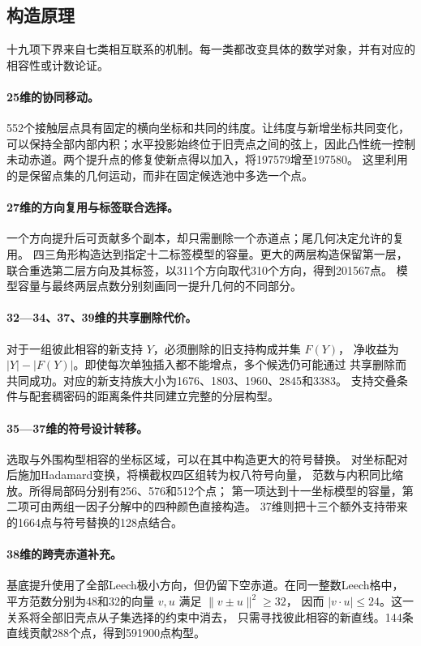 \subsection{构造原理}

十九项下界来自七类相互联系的机制。每一类都改变具体的数学对象，并有对应的
相容性或计数论证。

\paragraph{25维的协同移动。}
552个接触层点具有固定的横向坐标和共同的纬度。让纬度与新增坐标共同变化，
可以保持全部内部内积；水平投影始终位于旧壳点之间的弦上，因此凸性统一控制
未动赤道。两个提升点的修复使新点得以加入，将197579增至197580。
这里利用的是保留点集的几何运动，而非在固定候选池中多选一个点。

\paragraph{27维的方向复用与标签联合选择。}
一个方向提升后可贡献多个副本，却只需删除一个赤道点；尾几何决定允许的复用。
四三角形构造达到指定十二标签模型的容量。更大的两层构造保留第一层，
联合重选第二层方向及其标签，以311个方向取代310个方向，得到201567点。
模型容量与最终两层点数分别刻画同一提升几何的不同部分。

\paragraph{32—34、37、39维的共享删除代价。}
对于一组彼此相容的新支持 $Y$，必须删除的旧支持构成并集 $F(Y)$，
净收益为 $|Y|-|F(Y)|$。即使每次单独插入都不能增点，多个候选仍可能通过
共享删除而共同成功。对应的新支持族大小为1676、1803、1960、2845和3383。
支持交叠条件与配套稠密码的距离条件共同建立完整的分层构型。

\paragraph{35—37维的符号设计转移。}
选取与外围构型相容的坐标区域，可以在其中构造更大的符号替换。
对坐标配对后施加Hadamard变换，将横截权四区组转为权八符号向量，
范数与内积同比缩放。所得局部码分别有256、576和512个点；
第一项达到十一坐标模型的容量，第二项可由两组一因子分解中的四种颜色直接构造。
37维则把十三个额外支持带来的1664点与符号替换的128点结合。

\paragraph{38维的跨壳赤道补充。}
基底提升使用了全部Leech极小方向，但仍留下空赤道。在同一整数Leech格中，
平方范数分别为48和32的向量 $v,u$ 满足 $\|v\pm u\|^2\ge32$，
因而 $|v\cdot u|\le24$。这一关系将全部旧壳点从子集选择的约束中消去，
只需寻找彼此相容的新直线。144条直线贡献288个点，得到591900点构型。

